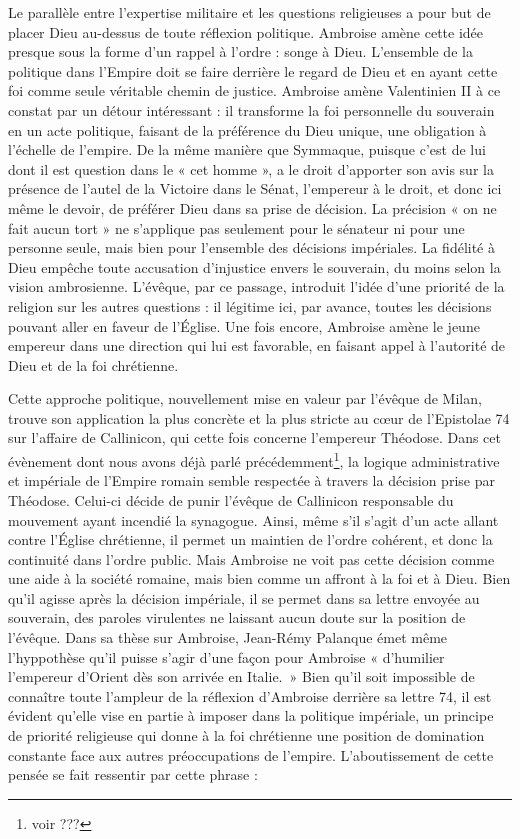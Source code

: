 \bigskip

Le parallèle entre l’expertise militaire et les questions religieuses a pour but de placer Dieu au-dessus de toute réflexion politique. Ambroise amène cette idée presque sous la forme d’un rappel à l’ordre : songe à Dieu. L’ensemble de la politique dans l’Empire doit se faire derrière le regard de Dieu et en ayant cette foi comme seule véritable chemin de justice. Ambroise amène Valentinien II à ce constat par un détour intéressant : il transforme la foi personnelle du souverain en un acte politique, faisant de la préférence du Dieu unique, une obligation à l’échelle de l’empire. De la même manière que Symmaque, puisque c’est de lui dont il est question dans le « cet homme », a le droit d’apporter son avis sur la présence de l’autel de la Victoire dans le Sénat, l'empereur à le droit, et donc ici même le devoir, de préférer Dieu dans sa prise de décision. La précision « on ne fait aucun tort » ne s’applique pas seulement pour le sénateur ni pour une personne seule, mais bien pour l'ensemble des décisions impériales. La fidélité à Dieu empêche toute accusation d’injustice envers le souverain, du moins selon la vision ambrosienne. L’évêque, par ce passage, introduit l’idée d’une priorité de la religion sur les autres questions : il légitime ici, par avance, toutes les décisions pouvant aller en faveur de l’Église. Une fois encore, Ambroise amène le jeune empereur dans une direction qui lui est favorable, en faisant appel à l’autorité de Dieu et de la foi chrétienne.

\bigskip

Cette approche politique, nouvellement mise en valeur par l’évêque de Milan, trouve son application la plus concrète et la plus stricte au cœur de l’Epistolae 74 sur l’affaire de Callinicon, qui cette fois concerne l’empereur Théodose. Dans cet évènement dont nous avons déjà parlé précédemment\footnote{voir ???}, la logique administrative et impériale de l’Empire romain semble respectée à travers la décision prise par Théodose. Celui-ci décide de punir l’évêque de Callinicon responsable du mouvement ayant incendié la synagogue. Ainsi, même s’il s’agit d’un acte allant contre l’Église chrétienne, il permet un maintien de l’ordre cohérent, et donc la continuité dans l’ordre public. Mais Ambroise ne voit pas cette décision comme une aide à la société romaine, mais bien comme un affront à la foi et à Dieu. Bien qu’il agisse après la décision impériale, il se permet dans sa lettre envoyée au souverain, des paroles virulentes ne laissant aucun doute sur la position de l’évêque. Dans sa thèse sur Ambroise, Jean-Rémy Palanque émet même l’hyppothèse qu’il puisse s’agir d’une façon pour Ambroise « d’humilier l’empereur d’Orient dès son arrivée en Italie.\autocite[374]{palanque_ambroise}~» Bien qu’il soit impossible de connaître toute l’ampleur de la réflexion d’Ambroise derrière sa lettre 74, il est évident qu’elle vise en partie à imposer dans la politique impériale, un principe de priorité religieuse qui donne à la foi chrétienne une position de domination constante face aux autres préoccupations de l’empire. L'aboutissement de cette pensée se fait ressentir par cette phrase :

